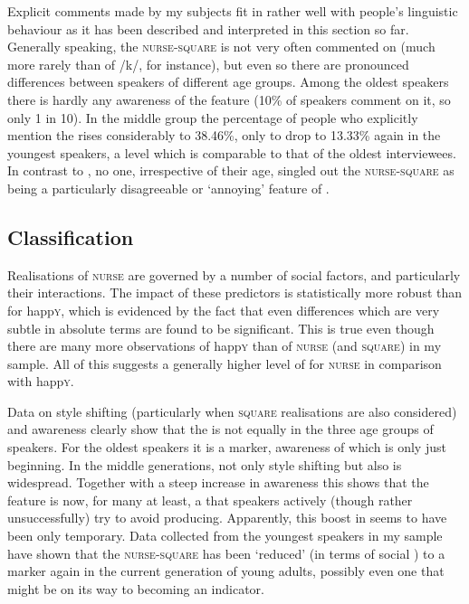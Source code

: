 Explicit comments made by my subjects fit in rather well with people's linguistic behaviour as it has been described and interpreted in this section so far.
Generally speaking, the \textsc{nurse}-\textsc{square}  is not very often commented on (much more rarely than  of /k/, for instance), but even so there are pronounced differences between speakers of different age groups.
Among the oldest speakers there is hardly any  awareness of the feature (10\% of speakers comment on it, so only 1 in 10).
In the middle group the percentage of people who explicitly mention the  rises considerably to 38.46\%, only to drop to 13.33\% again in the youngest speakers, a level which is comparable to that of the oldest interviewees.
In contrast to , no one, irrespective of their age, singled out the \textsc{nurse}-\textsc{square}  as being a particularly disagreeable or `annoying' feature of .

\subsection{Classification}

Realisations of \textsc{nurse} are governed by a number of social factors, and particularly their interactions.
The impact of these predictors is statistically more robust than for happ\textsc{y}, which is evidenced by the fact that even differences which are very subtle in absolute terms are found to be significant.
This is true even though there are many more observations of happ\textsc{y} than of \textsc{nurse} (and \textsc{square}) in my sample.
All of this suggests a generally higher level of  for \textsc{nurse} in comparison with happ\textsc{y}.

Data on style shifting (particularly when \textsc{square} realisations are also considered) and  awareness clearly show that the  is not equally  in the three age groups of speakers.
For the oldest speakers it is a marker, awareness of which is only just beginning.
In the middle generations, not only style shifting but also  is widespread.
Together with a steep increase in  awareness this shows that the feature is now, for many at least, a  that speakers actively (though rather unsuccessfully) try to avoid producing.
Apparently, this boost in  seems to have been only temporary.
Data collected from the youngest speakers in my sample have shown that the \textsc{nurse}-\textsc{square}  has been `reduced' (in terms of social ) to a marker again in the current generation of young adults, possibly even one that might be on its way to becoming an indicator.

